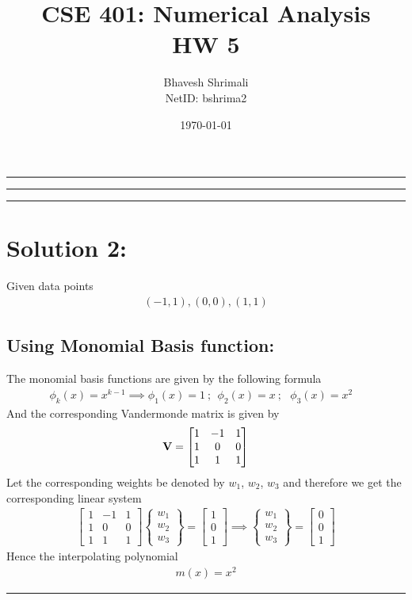 
\title{\bf CSE 401: Numerical Analysis \\ HW 5}
\author{Bhavesh Shrimali \\ NetID: bshrima2}
\date{\today}
\titlespacing*{\title}{-2ex}{*-2ex}{-2ex}

\maketitle \hrule \hrule \hrule
\section*{Solution 2:}
Given data points 
\begin{align*}
(-1,1),(0,0),(1,1)
\end{align*}
\subsection*{Using Monomial Basis function: }
The monomial basis functions are given by the following formula
\begin{align*}
\phi_k(x) = x^{k-1} \implies \phi_1(x)  = 1\ ;\ \ \phi_2(x)  = x\ ;\ \ \ \phi_3(x)  = x^2\ \ \ \  
\end{align*}
And the corresponding Vandermonde matrix is given by
\begin{align*}
{\bf V} = 
\begin{bmatrix}
1 & -1 & 1 \\
1 & 0 & 0 \\
1 & 1 & 1
\end{bmatrix}
\end{align*}
Let the corresponding weights be denoted by $w_1$, $w_2$, $w_3$ and therefore we get the corresponding linear system 
\begin{align*}
\begin{bmatrix}
1 & -1 & 1 \\
1 & 0 & 0 \\
1 & 1 & 1
\end{bmatrix}
\begin{Bmatrix}
w_1 \\ w_2 \\ w_3
\end{Bmatrix} = 
\begin{bmatrix}
1 \\ 0 \\ 1
\end{bmatrix}
\implies 
\begin{Bmatrix}
w_1 \\ w_2 \\ w_3
\end{Bmatrix} =
\begin{bmatrix}
0\\0\\1
\end{bmatrix}
\end{align*}
Hence the interpolating polynomial 
\begin{align*}
\boxed{m(x) = x^2}
\end{align*}\hrule


